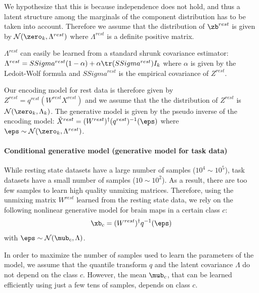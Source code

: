 We hypothesize that this is because independence does not hold, and
thus a latent structure among the marginals of the component distribution has to be taken into account. Therefore we assume that the distribution of $\zb^{rest}$ is given
by $\mathcal{N}(\zero_k, \Lambda^{rest})$ where $\Lambda^{rest}$ is a definite positive matrix.

$\Lambda^{rest}$ can easily be learned from a standard shrunk covariance
estimator: $\Lambda^{rest} = SSigma^{rest} (1 - \alpha) + \alpha \tr(SSigma^{rest}) I_k$ where
$\alpha$ is given by the Ledoit-Wolf formula \cite{ledoit2004well} and
$SSigma^{rest}$ is the empirical covariance of $Z^{rest}$.

Our encoding model for rest data is therefore given by \\ 
$Z^{rest} =
q^{rest}(W^{rest} X^{rest})$ and we assume that the the
distribution of $Z^{rest}$ is $\mathcal{N}(\zero_k, \Lambda_k)$.
The generative model is given by the pseudo inverse of the encoding model:
$\tilde{X}^{rest} = (W^{rest})^{\dagger} (q^{rest})^{-1}(\eps)$ where $\eps \sim
\mathcal{N}(\zero_k, \Lambda^{rest})$. 


\paragraph{Conditional generative model (generative model for task data)}
While resting state datasets have a large number of samples ($10^4 \sim 10^5$), task datasets   have a small number of samples ($10 \sim 10^2$). As a result, there are too few samples to learn high quality unmixing matrices. 
%
Therefore, using  the unmixing matrix $W^{rest}$ learned from the resting state data, we rely on the following nonlinear generative model for brain maps in a certain class $c$:
\begin{equation}
  \xb_c = (W^{rest})^{\dagger} q^{-1}(\eps)
\end{equation}
with $\eps \sim \mathcal{N}(\mub_c, \Lambda)$.

In order to maximize the number of samples used to learn the parameters of the
model, we assume that the quantile transform $q$ and the latent covariance
$\Lambda$ do not depend on the class $c$. However, the mean $\mub_c$, that can be learned efficiently using just a few tens of samples, depends on class $c$.

